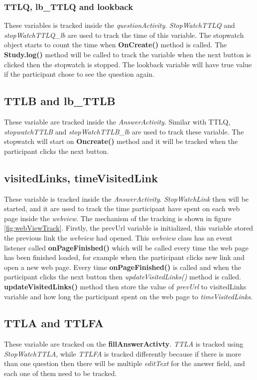\subsubsection{TTLQ, lb\_TTLQ and lookback}
These variables is tracked inside the \textit{questionActivity}.
\textit{StopWatchTTLQ} and \textit{stopWatchTTLQ\_lb} are used to track the time of this variable.
The stopwatch object starts to count the time when \textbf{OnCreate()} method is called.
The \textbf{Study.log()} method will be called to track the variable when the next button is clicked then the stopwatch is stopped.
The lookback variable will have true value if the participant chose to see the question again.

\subsection{TTLB and lb\_TTLB}
These variable are tracked inside the \textit{AnswerActivity}. Similar with TTLQ,
\textit{stopwatchTTLB} and \textit{stopWatchTTLB\_lb} are used to track these variable.
The stopwatch will start on \textbf{Oncreate()} method and it will be tracked when the participant clicks the next button.

\subsection{visitedLinks, timeVisitedLink}
These variable is tracked inside the \textit{AnswerActivity}.
\textit{StopWatchLink} then will be started, and it are used to track the time participant have spent on each web page inside the \textit{webview}.
The mechanism of the tracking is shown in figure \ref{fig:webViewTrack}. Firstly, the prevUrl variable is initialized,
this variable stored the previous link the \textit{webview} had opened. This \textit{webview} class has an event listener called \textbf{onPageFinished()}
 which will be called every time the web page has been finished loaded, for example when the participant clicks new  link and open a new web page.
  Every time \textbf{onPageFinished()} is called and when the participant clicks the next button then \textit{updateVisitedLinks()} method is called.
  \textbf{updateVisitedLinks()} method then store the value of \textit{prevUrl}
 to visitedLinks variable and how long the participant spent on the web page to \textit{timeVisitedLinks}.

\subsection{TTLA and TTLFA}
These variable are tracked on the \textbf{fillAnswerActivty}. \textit{TTLA} is tracked using \textit{StopWatchTTLA}, while
\textit{TTLFA} is tracked differently because if there is more than one question then there will be multiple \textit{editText} for the answer field, and
each one of them need to be tracked.

